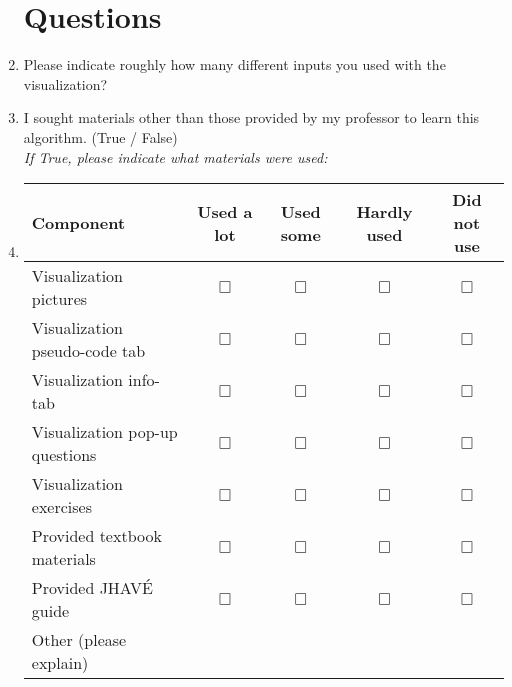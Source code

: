 \documentclass[letter]{article}
\begin{document}
\begin{enumerate}

\section*{Questions}

\item Please indicate roughly how many different inputs you used with the visualization? \underline{\hspace{1cm}}

\item I sought materials other than those provided by my professor to learn this algorithm.
(True / False) \\ \textsl{If True, please indicate what materials were used:}


\item
\begin{tabular}{| l | c | c | c | c |}
\hline
\textbf{Component} & \textbf{Used a lot} & \textbf{Used some} & \textbf{Hardly used} & \textbf{Did not use} \\
\hline
Visualization pictures & $\Box$ & $\Box$ & $\Box$ & $\Box$ \\
\hline
Visualization pseudo-code tab & $\Box$ & $\Box$ & $\Box$ & $\Box$ \\
\hline
Visualization info-tab & $\Box$ & $\Box$ & $\Box$ & $\Box$ \\
\hline
Visualization pop-up questions & $\Box$ & $\Box$ & $\Box$ & $\Box$ \\
\hline
Visualization exercises & $\Box$ & $\Box$ & $\Box$ & $\Box$ \\
\hline
Provided textbook materials & $\Box$ & $\Box$ & $\Box$ & $\Box$ \\
\hline
Provided JHAVÉ guide & $\Box$ & $\Box$ & $\Box$ & $\Box$ \\
\hline
Other (please explain) &&&&\\ %
\hline
\end{tabular}

\addtocounter{enumi}{7}


\end{enumerate}
\end{document}
